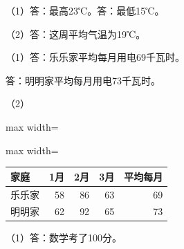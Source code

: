 
\begingroup\color{answerred}\noindent（1）答：最高23℃。答：最低15℃。\par
\noindent（2）答：这周平均气温为19℃。\par\par\endgroup
{}
\begingroup\color{answerred}（1）答：乐乐家平均每月用电69千瓦时。\par\hspace*{2em}答：明明家平均每月用电73千瓦时。\par（2）\par\smallskip\noindent\begin{adjustbox}{max width=\linewidth}\begin{adjustbox}{max width=\linewidth}\begin{tabular}{lrrrr}\toprule 家庭 & 1月 & 2月 & 3月 & 平均每月\\\midrule 乐乐家 &58&86&63&69\\明明家 &62&92&65&73\\\bottomrule\end{tabular}\end{adjustbox}\end{adjustbox}\par\smallskip\par\endgroup
{}
\begingroup\color{answerred}\noindent（1）答：数学考了100分。\par\par\endgroup

